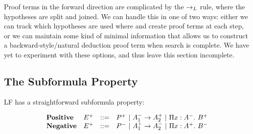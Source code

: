 \documentclass[11pt,twoside]{article}
\begin{document}
Proof terms in the forward direction are complicated by the
$\to_L$ rule, where the hypotheses are split and joined.
We can handle this in one of two ways: either we can
track which hypotheses are used where and create proof terms
at each step, or we can maintain some kind of minimal information
that allows us to construct a backward-style/natural deduction
proof term when search is complete.  We have yet to experiment
with these options, and thus leave this section incomplete.

\subsection{The Subformula Property}

LF has a straightforward subformula property:

$$
\begin{array}{llll}
\mathbf{Positive} & E^+ & ::= & P^+ \ |\  A_1^- \to A_2^+ \ |\  \Pi x : A^-.\ B^+\\
\mathbf{Negative} & E^+ & ::= & P^- \ |\  A_1^+ \to A_2^- \ |\  \Pi x : A^+.\ B^-\\
\end{array} 
$$







\end{document}
